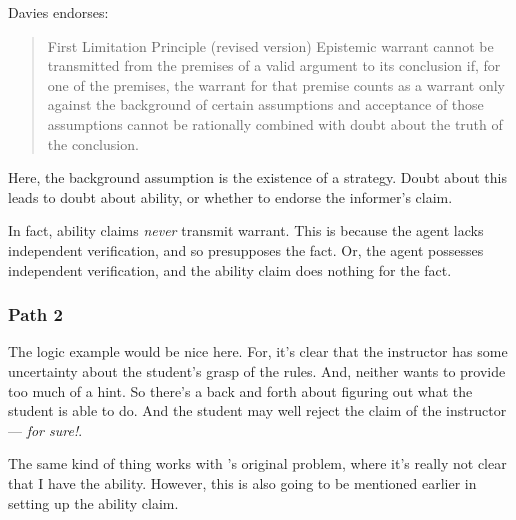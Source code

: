 \documentclass[10pt]{article}
\begin{document}
Davies endorses:
\begin{quote}
  First Limitation Principle (revised version) Epistemic warrant cannot be transmitted from the premises of a valid argument to its conclusion if, for one of the premises, the warrant for that premise counts as a warrant only against the background of certain assumptions and acceptance of those assumptions cannot be rationally combined with doubt about the truth of the conclusion.
\end{quote}
Here, the background assumption is the existence of a strategy.
Doubt about this leads to doubt about ability, or whether to endorse the informer's claim.

In fact, ability claims \emph{never} transmit warrant.
This is because the agent lacks independent verification, and so presupposes the fact.
Or, the agent possesses independent verification, and the ability claim does nothing for the fact.


\subsubsection{Path 2}
\label{sec:path-2}

\begin{note}
  The logic example would be nice here.
  For, it's clear that the instructor has some uncertainty about the student's grasp of the rules.
  And, neither wants to provide too much of a hint.
  So there's a back and forth about figuring out what the student is able to do.
  And the student may well reject the claim of the instructor --- \emph{for sure!}.
\end{note}

\begin{note}
  The same kind of thing works with \cite{Emms:2000aa}'s original problem, where it's really not clear that I have the ability.
  However, this is also going to be mentioned earlier in setting up the ability claim.
\end{note}
\end{document}
